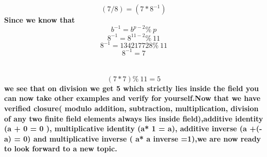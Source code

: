 \documentclass{article}
\begin{document}
\textbf {\[(7/8) = (7 * 8^{-1})\]}
\textbf { Since we know that }
\textbf {\[b^{-1} = b ^{p-2} \%\ p \]}
\textbf {\[8 ^{-1} = 8 ^{11-2} \%\ 11 \]}
\textbf {\[8 ^{-1} = 134217728 \%\ 11 \]}
\textbf {\[8 ^{-1} = 7 \]}
\\
\\
\textbf {\[(7* 7) \%\ 11 = 5\]}
\textbf { we see that on division we get 5 which strictly lies inside the field you can now take other examples and verify for yourself.Now that we have verified closure( modulo addition, subtraction, multiplication, division of any two finite field elements always lies inside field),additive identity (a + 0 = 0 ), multiplicative identity (a* 1 = a), additive inverse (a +(-a) = 0) and multiplicative inverse ( a* a inverse =1),we are now ready to look forward to a new topic. }

\pagebreak
\end{document}
